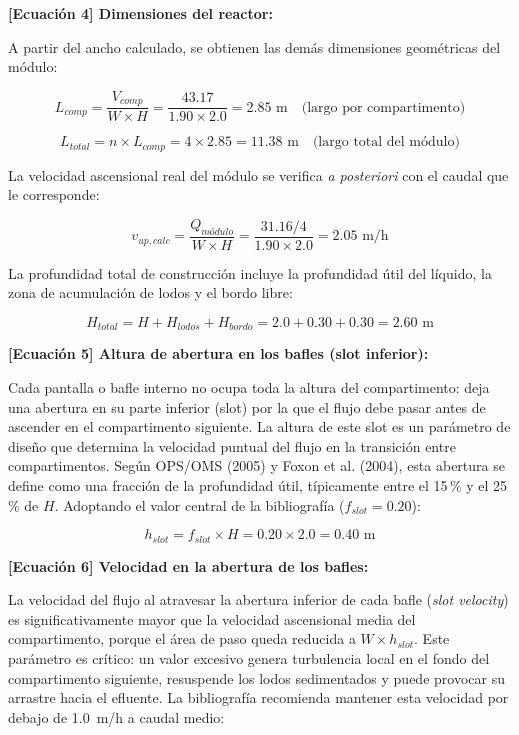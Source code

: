 \documentclass[12pt,a4paper]{article}
\begin{document}
\textbf{[Ecuación 4] Dimensiones del reactor:}

A partir del ancho calculado, se obtienen las demás dimensiones geométricas del módulo:

\begin{equation}
L_{comp} = \frac{V_{comp}}{W \times H} = \frac{43.17}{1.90 \times 2.0} = 2.85 \text{ m} \quad \text{(largo por compartimento)}
\end{equation}

\begin{equation}
L_{total} = n \times L_{comp} = 4 \times 2.85 = 11.38 \text{ m} \quad \text{(largo total del módulo)}
\end{equation}

La velocidad ascensional real del módulo se verifica \textit{a posteriori} con el caudal que le corresponde:

\begin{equation}
v_{up,calc} = \frac{Q_{módulo}}{W \times H} = \frac{31.16 / 4}{1.90 \times 2.0} = 2.05 \text{ m/h}
\end{equation}


La profundidad total de construcción incluye la profundidad útil del líquido, la zona de acumulación de lodos y el bordo libre:

\begin{equation}
H_{total} = H + H_{lodos} + H_{bordo} = 2.0 + 0.30 + 0.30 = 2.60 \text{ m}
\end{equation}

\textbf{[Ecuación 5] Altura de abertura en los bafles (slot inferior):}

Cada pantalla o bafle interno no ocupa toda la altura del compartimento: deja una abertura en su parte inferior (slot) por la que el flujo debe pasar antes de ascender en el compartimento siguiente. La altura de este slot es un parámetro de diseño que determina la velocidad puntual del flujo en la transición entre compartimentos. Según OPS/OMS (2005) y Foxon et al. (2004), esta abertura se define como una fracción de la profundidad útil, típicamente entre el 15\,\% y el 25\,\% de $H$. Adoptando el valor central de la bibliografía ($f_{slot} = 0.20$):

\begin{equation}
h_{slot} = f_{slot} \times H = 0.20 \times 2.0 = 0.40 \text{ m}
\end{equation}

\textbf{[Ecuación 6] Velocidad en la abertura de los bafles:}

La velocidad del flujo al atravesar la abertura inferior de cada bafle (\textit{slot velocity}) es significativamente mayor que la velocidad ascensional media del compartimento, porque el área de paso queda reducida a $W \times h_{slot}$. Este parámetro es crítico: un valor excesivo genera turbulencia local en el fondo del compartimento siguiente, resuspende los lodos sedimentados y puede provocar su arrastre hacia el efluente. La bibliografía recomienda mantener esta velocidad por debajo de 1.0~m/h a caudal medio:
\end{document}
